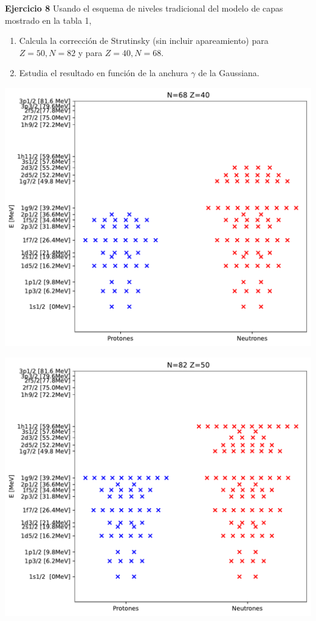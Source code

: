 

\begin{texercise}
    \textbf{Ejercicio 8}
    Usando el esquema de niveles tradicional del modelo de capas mostrado en la tabla 1,
    \begin{enumerate}
        \item Calcula la corrección de Strutinsky (sin incluir apareamiento) para $Z=50, N=82$ y para $Z=40, N=68$.
        \item Estudia el resultado en función de la anchura $\gamma$ de la Gaussiana.
    \end{enumerate}
\tcblower
    \begin{center}
        \includegraphics[width=0.6\linewidth]{Cuerpo/Boletin_01/N68_Z40_Bandas.pdf}
    \end{center}
    \begin{center}
        \includegraphics[width=0.6\linewidth]{Cuerpo/Boletin_01/N82_Z50_Bandas.pdf}
    \end{center}
    \begin{center}

\end{center}
\end{texercise}
